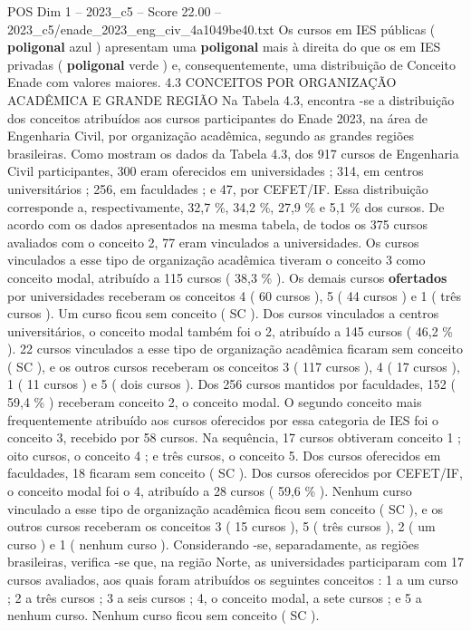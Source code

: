 \begin{textsample}{POS Dim 1 – 2023\_c5 – Score 22.00 – 2023\_c5/enade\_2023\_eng\_civ\_4a1049be40.txt}
Os cursos em IES públicas ( \textbf{poligonal} azul ) apresentam uma \textbf{poligonal} mais à direita do que os em IES privadas ( \textbf{poligonal} verde ) e, consequentemente, uma distribuição de Conceito Enade com valores maiores. 4.3 CONCEITOS POR ORGANIZAÇÃO ACADÊMICA E GRANDE REGIÃO Na Tabela 4.3, encontra -se a distribuição dos conceitos atribuídos aos cursos participantes do Enade 2023, na área de Engenharia Civil, por organização acadêmica, segundo as grandes regiões brasileiras.
Como mostram os dados da Tabela 4.3, dos 917 cursos de Engenharia Civil participantes, 300 eram oferecidos em universidades ; 314, em centros universitários ; 256, em faculdades ; e 47, por CEFET/IF.
Essa distribuição corresponde a, respectivamente, 32,7 \%, 34,2 \%, 27,9 \% e 5,1 \% dos cursos.
De acordo com os dados apresentados na mesma tabela, de todos os 375 cursos avaliados com o conceito 2, 77 eram vinculados a universidades.
Os cursos vinculados a esse tipo de organização acadêmica tiveram o conceito 3 como conceito modal, atribuído a 115 cursos ( 38,3 \% ).
Os demais cursos \textbf{ofertados} por universidades receberam os conceitos 4 ( 60 cursos ), 5 ( 44 cursos ) e 1 ( três cursos ).
Um curso ficou sem conceito ( SC ).
Dos cursos vinculados a centros universitários, o conceito modal também foi o 2, atribuído a 145 cursos ( 46,2 \% ). 22 cursos vinculados a esse tipo de organização acadêmica ficaram sem conceito ( SC ), e os outros cursos receberam os conceitos 3 ( 117 cursos ), 4 ( 17 cursos ), 1 ( 11 cursos ) e 5 ( dois cursos ).
Dos 256 cursos mantidos por faculdades, 152 ( 59,4 \% ) receberam conceito 2, o conceito modal.
O segundo conceito mais frequentemente atribuído aos cursos oferecidos por essa categoria de IES foi o conceito 3, recebido por 58 cursos.
Na sequência, 17 cursos obtiveram conceito 1 ; oito cursos, o conceito 4 ; e três cursos, o conceito 5.
Dos cursos oferecidos em faculdades, 18 ficaram sem conceito ( SC ).
Dos cursos oferecidos por CEFET/IF, o conceito modal foi o 4, atribuído a 28 cursos ( 59,6 \% ).
Nenhum curso vinculado a esse tipo de organização acadêmica ficou sem conceito ( SC ), e os outros cursos receberam os conceitos 3 ( 15 cursos ), 5 ( três cursos ), 2 ( um curso ) e 1 ( nenhum curso ).
Considerando -se, separadamente, as regiões brasileiras, verifica -se que, na região Norte, as universidades participaram com 17 cursos avaliados, aos quais foram atribuídos os seguintes conceitos : 1 a um curso ; 2 a três cursos ; 3 a seis cursos ; 4, o conceito modal, a sete cursos ; e 5 a nenhum curso.
Nenhum curso ficou sem conceito ( SC ).

\end{textsample}
